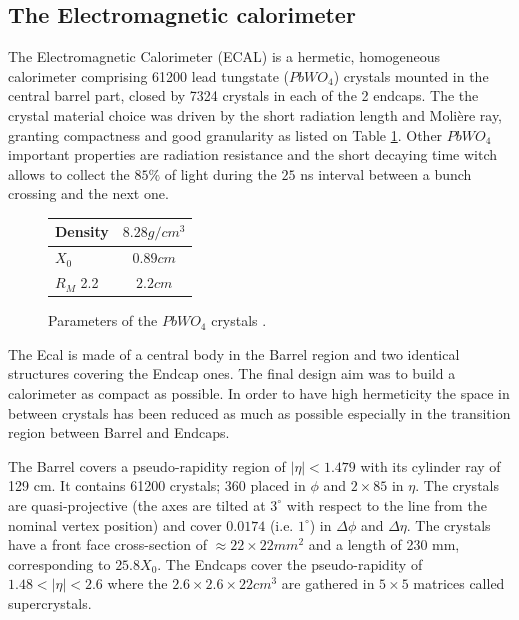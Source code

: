 \clearpage

\subsection{The Electromagnetic calorimeter}

The Electromagnetic Calorimeter (ECAL) is a hermetic, homogeneous calorimeter comprising 61200 lead tungstate ($PbWO_{4}$) crystals mounted in the central barrel part, closed by 7324 crystals in each of the 2 endcaps.
The the crystal material choice was driven by the short radiation length and Molière ray, granting compactness and good granularity as listed on Table \ref{table:CMS_PbWO4}. Other $PbWO_{4}$ important properties are radiation resistance and the short decaying time witch allows to collect the $85\%$ of light during the $25$ ns interval between a bunch crossing and the next one.

\begin{figure}[tbh!]
	\begin{center}
		
		\begin{tabular}{ | l | c |}
			\hline
			Density  & $ 8.28 g/cm^{3}$ \\ \hline
			$X_{0}$   & $0.89 cm$  \\ \hline
			$R_{M}$ 2.2 & $2.2 cm$  \\ \hline
			\hline
		\end{tabular}
		\caption{Parameters of the $PbWO_{4}$ crystals .}
		\label{table:CMS_PbWO4}
	\end{center}
\end{figure}

The Ecal is made of a central body in the Barrel region and two identical structures covering the Endcap ones. The final design aim was to build a calorimeter as compact as possible. In order to have high hermeticity the space in between crystals has been reduced as much as possible especially in the transition region between Barrel and Endcaps. 

The Barrel covers a pseudo-rapidity region of $|\eta| < 1.479$ with its cylinder ray of 129 cm. It contains 61200 crystals; 360 placed in $\phi$ and $2\times85$ in $\eta$. The crystals are quasi-projective (the axes are tilted at $3^{\circ}$ with respect to the line from the nominal vertex position) and cover $0.0174$ (i.e. $1^{\circ}$) in $\Delta\phi$ and $\Delta\eta$. The crystals have a front face cross-section of $\approx 22\times22 mm^{2}$ and a length of 230 mm, corresponding to $25.8 X_{0}$. The Endcaps cover the pseudo-rapidity of $1.48 < |\eta| < 2.6$ where the $2.6\times2.6\times22 cm^{3}$ are gathered in $5\times5$ matrices called supercrystals.

